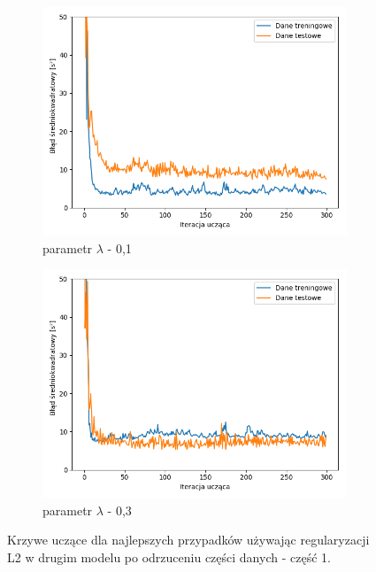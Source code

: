 \documentclass[12pt]{aghdpl}
\begin{document}
		\begin{figure}[h]
			\centering
		 	\begin{subfigure}{.8\linewidth}
		 		\includegraphics[width =\linewidth]{wykresy/7_badanie_danych/l2/regularyzacja_0_1_wykres_uczenia.png}
		 		\caption{parametr $\lambda$ - 0,1}
		 	\end{subfigure}
		 	\begin{subfigure}{.8\linewidth}
		 		\includegraphics[width =\linewidth]{wykresy/7_badanie_danych/l2/regularyzacja_0_3_wykres_uczenia.png}
		 		\caption{parametr $\lambda$ - 0,3}
		 	\end{subfigure}
		 	
		 	\caption{Krzywe uczące dla najlepszych przypadków używając regularyzacji L2 w drugim modelu po odrzuceniu części danych - część 1.}
			\label{fig: drugi_model_przy_regularyzacji_l2_po_odrzuceniu_czesci_danych_wykresy_uczenia_1}
		\end{figure}
		
\end{document}
